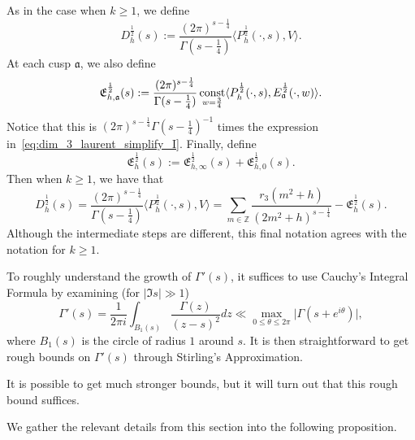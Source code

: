 As in the case when $k \geq 1$, we define
\begin{equation}\label{eq:hyp:Dh_def_half}
  D_h^{\frac{1}{2}}(s) :=
  \frac{(2\pi)^{s - \frac{1}{4}}}{\Gamma(s - \frac{1}{4})}
  \langle P_h^{\frac{1}{2}}(\cdot, s), V \rangle.
\end{equation}
At each cusp $\mathfrak{a}$, we also define
\begin{equation}
  \mathfrak{E}_{h, \mathfrak{a}}^{\frac{1}{2}}(s)
  :=
  \frac{(2\pi)^{s - \frac{1}{4}}}{\Gamma(s - \frac{1}{4})} \operatorname*{const}_{w = \frac{3}{4}}
  \langle P_h^{\frac{1}{2}}(\cdot, s), E_\mathfrak{a}^{\frac{1}{2}}(\cdot, w) \rangle.
\end{equation}
Notice that this is $(2\pi)^{s-\frac{1}{4}} \Gamma(s - \frac{1}{4})^{-1}$ times
the expression in~\eqref{eq:dim_3_laurent_simplify_I}.
Finally, define
\begin{equation}
  \mathfrak{E}_h^{\frac{1}{2}}(s)
  :=
  \mathfrak{E}_{h, \infty}^{\frac{1}{2}}(s) + \mathfrak{E}_{h, 0}^{\frac{1}{2}}(s).
\end{equation}
Then when $k \geq 1$, we have that
\begin{equation}
  D^{\frac{1}{2}}_h(s) = \frac{(2\pi)^{s - \frac{1}{4}}}{\Gamma(s - \frac{1}{4})}
  \langle P_h^{\frac{1}{2}}(\cdot, s), V\rangle
  =
  \sum_{m \in \mathbb{Z}}
  \frac{r_{3}(m^2 + h)}{(2m^2 + h)^{s - \frac{1}{4}}}
  -
  \mathfrak{E}_h^{\frac{1}{2}}(s).
\end{equation}
Although the intermediate steps are different, this final notation agrees with the
notation for $k \geq 1$.



To roughly understand the growth of $\Gamma'(s)$, it suffices to use Cauchy's
Integral Formula by examining (for $\lvert \Im s \rvert \gg 1$)
\begin{equation}
  \Gamma'(s) = \frac{1}{2\pi i} \int_{B_1(s)} \frac{\Gamma(z)}{(z - s)^2}dz \ll \max_{0
  \leq \theta \leq 2\pi} \lvert \Gamma(s + e^{i \theta}) \rvert,
\end{equation}
where $B_1(s)$ is the circle of radius $1$ around $s$.
It is then straightforward to get rough bounds on $\Gamma'(s)$ through
Stirling's Approximation.


\begin{remark}
  It is possible to get much stronger bounds, but it will turn out that this
  rough bound suffices.
\end{remark}


We gather the relevant details from this section into the following proposition.


